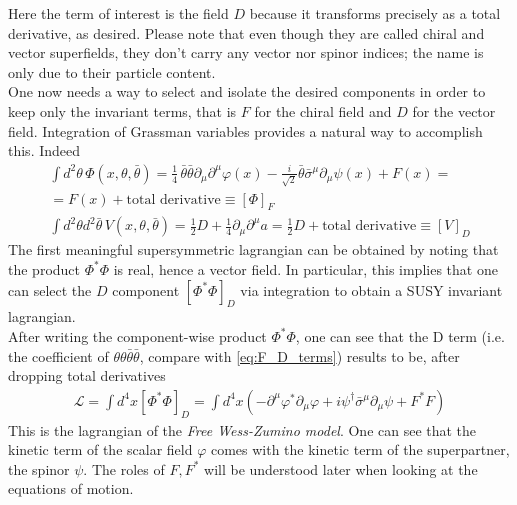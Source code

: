 \documentclass[12pt]{article}
\begin{document}
Here the term of interest is the field $D$ because it transforms precisely as a total derivative, as desired. Please note that even though they are called chiral and vector superfields, they don't carry any vector nor spinor indices; the name is only due to their particle content. \\
One now needs a way to select and isolate the desired components in order to keep only the invariant terms, that is $F$ for the chiral field and $D$ for the vector field. Integration of Grassman variables provides a natural way to accomplish this. Indeed 
\begin{equation}\begin{gathered}
  \int d^2\theta \, \Phi(x, \theta, \bar\theta) = \frac{1}{4} \, \bar\theta \bar\theta \partial_\mu \partial^\mu \varphi(x) - \frac{i}{\sqrt{2}} \bar\theta \bar\sigma^\mu \partial_\mu \psi(x) + F(x) = \\
  = F(x) + \text{total derivative} \equiv \left[\Phi\right]_F \\
  \int d^2\theta d^2\bar\theta \, V(x, \theta, \bar\theta) = \frac{1}{2} D + \frac{1}{4} \partial_\mu \partial^\mu a = \frac{1}{2} D + \text{total derivative} \equiv \left[V\right]_D
\end{gathered}
\label{eq:F_D_terms}
\end{equation}
The first meaningful supersymmetric lagrangian can be obtained by noting that the product $\Phi^*\Phi$ is real, hence a vector field. In particular, this implies that one can select the $D$ component $\left[\Phi^*\Phi\right]_D$ via integration to obtain a SUSY invariant lagrangian. \\
After writing the component-wise product $\Phi^*\Phi$, one can see that the D term (i.e. the coefficient of $\theta\theta\bar\theta\bar\theta$, compare with \ref{eq:F_D_terms}) results to be, after dropping total derivatives
\begin{gather*}
  \mathcal{L} = \int d^4 x \left[\Phi^*\Phi\right]_D = \int d^4 x \left( -\partial^\mu \varphi^* \partial_\mu \varphi + i \psi^\dagger \bar\sigma^\mu \partial_\mu \psi + F^*F \right)
\end{gather*}
This is the lagrangian of the \emph{Free Wess-Zumino model}. One can see that the kinetic term of the scalar field $\varphi$ comes with the kinetic term of the superpartner, the spinor $\psi$. The roles of $F, F^*$ will be understood later when looking at the equations of motion. \par 

\newpage 
\end{document}
